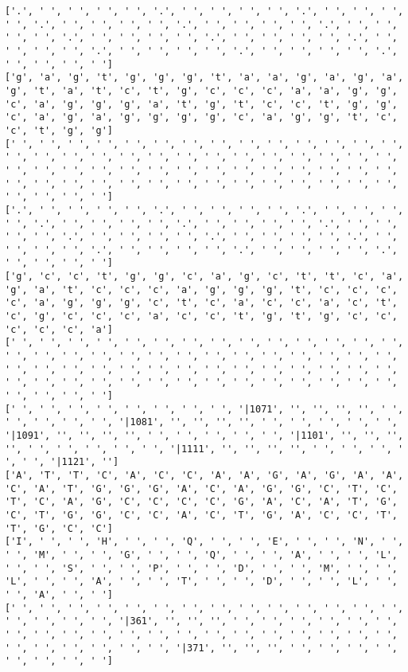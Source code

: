 \documentclass{article}
\begin{document}
\begin{Verbatim}
['.', ' ', ' ', ' ', ' ', '.', ' ', ' ', ' ', ' ', '.', ' ', ' ', ' ', ' ', '.', ' ', ' ', ' ', ' ', '.', ' ', ' ', ' ', ' ', '.', ' ', ' ', ' ', ' ', '.', ' ', ' ', ' ', ' ', '.', ' ', ' ', ' ', ' ', '.', ' ', ' ', ' ', ' ', '.', ' ', ' ', ' ', ' ', '.', ' ', ' ', ' ', ' ', '.', ' ', ' ', ' ', ' ']
['g', 'a', 'g', 't', 'g', 'g', 'g', 't', 'a', 'a', 'g', 'a', 'g', 'a', 'g', 't', 'a', 't', 'c', 't', 'g', 'c', 'c', 'c', 'a', 'a', 'g', 'g', 'c', 'a', 'g', 'g', 'g', 'a', 't', 'g', 't', 'c', 'c', 't', 'g', 'g', 'c', 'a', 'g', 'a', 'g', 'g', 'g', 'g', 'c', 'a', 'g', 'g', 't', 'c', 'c', 't', 'g', 'g']
[' ', ' ', ' ', ' ', ' ', ' ', ' ', ' ', ' ', ' ', ' ', ' ', ' ', ' ', ' ', ' ', ' ', ' ', ' ', ' ', ' ', ' ', ' ', ' ', ' ', ' ', ' ', ' ', ' ', ' ', ' ', ' ', ' ', ' ', ' ', ' ', ' ', ' ', ' ', ' ', ' ', ' ', ' ', ' ', ' ', ' ', ' ', ' ', ' ', ' ', ' ', ' ', ' ', ' ', ' ', ' ', ' ', ' ', ' ', ' ']
['.', ' ', ' ', ' ', ' ', '.', ' ', ' ', ' ', ' ', '.', ' ', ' ', ' ', ' ', '.', ' ', ' ', ' ', ' ', '.', ' ', ' ', ' ', ' ', '.', ' ', ' ', ' ', ' ', '.', ' ', ' ', ' ', ' ', '.', ' ', ' ', ' ', ' ', '.', ' ', ' ', ' ', ' ', '.', ' ', ' ', ' ', ' ', '.', ' ', ' ', ' ', ' ', '.', ' ', ' ', ' ', ' ']
['g', 'c', 'c', 't', 'g', 'g', 'c', 'a', 'g', 'c', 't', 't', 'c', 'a', 'g', 'a', 't', 'c', 'c', 'c', 'a', 'g', 'g', 'g', 't', 'c', 'c', 'c', 'c', 'a', 'g', 'g', 'g', 'c', 't', 'c', 'a', 'c', 'c', 'a', 'c', 't', 'c', 'g', 'c', 'c', 'c', 'a', 'c', 'c', 't', 'g', 't', 'g', 'c', 'c', 'c', 'c', 'c', 'a']
[' ', ' ', ' ', ' ', ' ', ' ', ' ', ' ', ' ', ' ', ' ', ' ', ' ', ' ', ' ', ' ', ' ', ' ', ' ', ' ', ' ', ' ', ' ', ' ', ' ', ' ', ' ', ' ', ' ', ' ', ' ', ' ', ' ', ' ', ' ', ' ', ' ', ' ', ' ', ' ', ' ', ' ', ' ', ' ', ' ', ' ', ' ', ' ', ' ', ' ', ' ', ' ', ' ', ' ', ' ', ' ', ' ', ' ', ' ', ' ']
[' ', ' ', ' ', ' ', ' ', ' ', ' ', ' ', '|1071', '', '', '', '', ' ', ' ', ' ', ' ', ' ', '|1081', '', '', '', '', ' ', ' ', ' ', ' ', ' ', '|1091', '', '', '', '', ' ', ' ', ' ', ' ', ' ', '|1101', '', '', '', '', ' ', ' ', ' ', ' ', ' ', '|1111', '', '', '', '', ' ', ' ', ' ', ' ', ' ', '|1121', '']
['A', 'T', 'T', 'C', 'A', 'C', 'C', 'A', 'A', 'G', 'A', 'G', 'A', 'A', 'C', 'A', 'T', 'G', 'G', 'G', 'A', 'C', 'A', 'G', 'G', 'C', 'T', 'C', 'T', 'C', 'A', 'G', 'C', 'C', 'C', 'C', 'G', 'A', 'C', 'A', 'T', 'G', 'C', 'T', 'G', 'G', 'C', 'C', 'A', 'C', 'T', 'G', 'A', 'C', 'C', 'T', 'T', 'G', 'C', 'C']
['I', ' ', ' ', 'H', ' ', ' ', 'Q', ' ', ' ', 'E', ' ', ' ', 'N', ' ', ' ', 'M', ' ', ' ', 'G', ' ', ' ', 'Q', ' ', ' ', 'A', ' ', ' ', 'L', ' ', ' ', 'S', ' ', ' ', 'P', ' ', ' ', 'D', ' ', ' ', 'M', ' ', ' ', 'L', ' ', ' ', 'A', ' ', ' ', 'T', ' ', ' ', 'D', ' ', ' ', 'L', ' ', ' ', 'A', ' ', ' ']
[' ', ' ', ' ', ' ', ' ', ' ', ' ', ' ', ' ', ' ', ' ', ' ', ' ', ' ', ' ', ' ', ' ', ' ', '|361', '', '', '', ' ', ' ', ' ', ' ', ' ', ' ', ' ', ' ', ' ', ' ', ' ', ' ', ' ', ' ', ' ', ' ', ' ', ' ', ' ', ' ', ' ', ' ', ' ', ' ', ' ', ' ', '|371', '', '', '', ' ', ' ', ' ', ' ', ' ', ' ', ' ', ' ']
  

\end{Verbatim}
\end{document}
